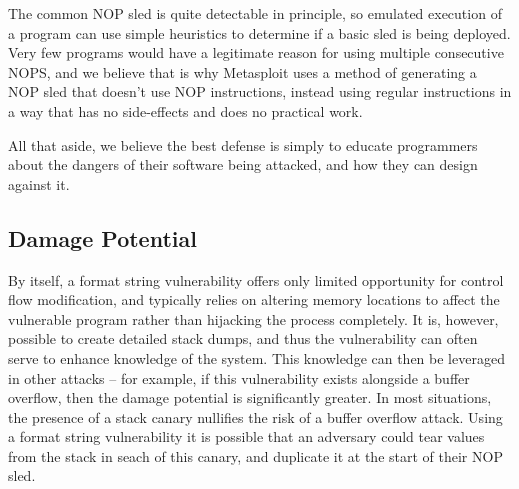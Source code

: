The common NOP sled is quite detectable in principle, so emulated execution of a program can use simple heuristics to
determine if a basic sled is being deployed. Very few programs would have a legitimate reason for using multiple
consecutive NOPS\cite{zip_quine}, and we believe that is why Metasploit uses a method of generating a NOP sled that
doesn't use NOP instructions, instead using regular instructions in a way that has no side-effects and does no practical
work\cite{wiki_sled}.

All that aside, we believe the best defense is simply to educate programmers about the dangers of their software being
attacked, and how they can design against it.

\subsection{Damage Potential}

By itself, a format string vulnerability offers only limited opportunity for control flow modification, and typically
relies on altering memory locations to affect the vulnerable program rather than hijacking the process completely.
It is, however, possible to create detailed stack dumps, and thus the vulnerability can often serve to
enhance knowledge of the system. This knowledge can then be leveraged in other attacks -- for example, if this
vulnerability exists alongside a buffer overflow, then the damage potential is significantly greater. In most
situations, the presence of a stack canary nullifies the risk of a buffer overflow attack. Using a format string
vulnerability it is possible that an adversary could tear values from the stack in seach of this canary, and duplicate
it at the start of their NOP sled.

